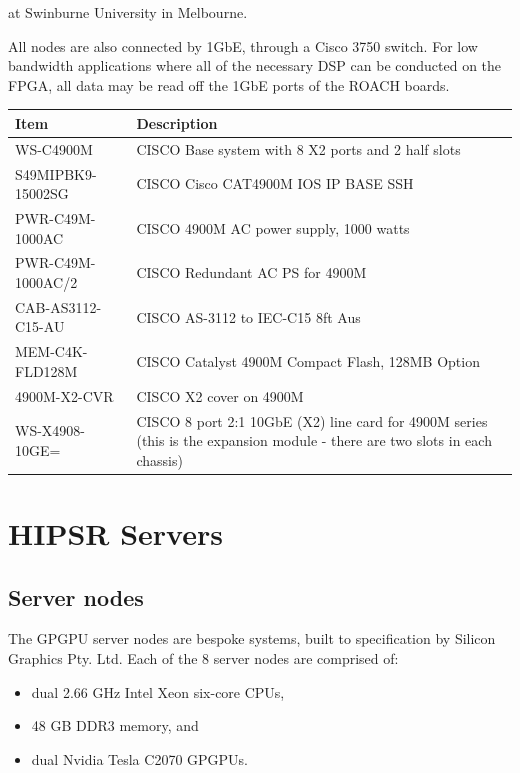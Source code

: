 \documentclass[letterpaper,10pt,english]{sphinxmanual}
\begin{document}
at Swinburne University in Melbourne.

All nodes are also connected by 1GbE, through a Cisco 3750 switch. For low bandwidth applications where all of the necessary DSP can be conducted on the FPGA, all data may be read off the 1GbE ports of the ROACH boards.

\begin{tabulary}{\linewidth}{|L|L|}
\hline
\textbf{
Item
} & \textbf{
Description
}\\\hline

WS-C4900M
 & 
CISCO Base system with 8 X2 ports and 2 half slots
\\\hline

S49MIPBK9-15002SG
 & 
CISCO Cisco CAT4900M IOS IP BASE SSH
\\\hline

PWR-C49M-1000AC
 & 
CISCO 4900M AC power supply, 1000 watts
\\\hline

PWR-C49M-1000AC/2
 & 
CISCO Redundant AC PS for 4900M
\\\hline

CAB-AS3112-C15-AU
 & 
CISCO AS-3112 to IEC-C15 8ft Aus
\\\hline

MEM-C4K-FLD128M
 & 
CISCO Catalyst 4900M Compact Flash, 128MB Option
\\\hline

4900M-X2-CVR
 & 
CISCO X2 cover on 4900M
\\\hline

WS-X4908-10GE=
 & 
CISCO 8 port 2:1 10GbE (X2) line card for 4900M series
(this is the expansion module - there are two slots
in each chassis)
\\\hline
\end{tabulary}



\section{HIPSR Servers}
\label{hardware:hipsr-servers}

\subsection{Server nodes}
\label{hardware:server-nodes}
The GPGPU server nodes are bespoke systems, built to specification by Silicon Graphics Pty. Ltd. Each of the 8 server nodes are comprised of:
\begin{itemize}
\item {} 
dual 2.66 GHz Intel Xeon six-core CPUs,

\item {} 
48 GB DDR3 memory, and

\item {} 
dual Nvidia Tesla C2070 GPGPUs.

\end{itemize}
\end{document}
